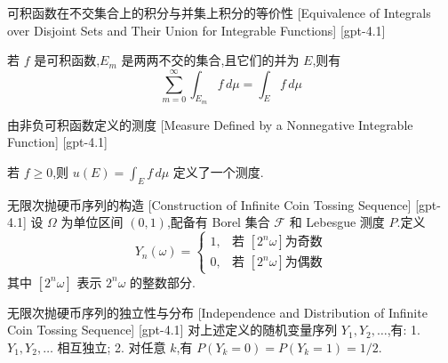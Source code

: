 \documentclass[UTF8]{ctexart}
\begin{document}
    
    
    \begin{thm}
        {可积函数在不交集合上的积分与并集上积分的等价性}
        [Equivalence of Integrals over Disjoint Sets and Their Union for Integrable Functions]
        [gpt-4.1]
        
若 $f$ 是可积函数,$E_{m}$ 是两两不交的集合,且它们的并为 $E$,则有
\[
\sum_{m = 0}^{\infty} \int_{E_{m}} f \, d\mu = \int_{E} f \, d\mu
\]

    \end{thm}
    
    
    
    \begin{dfn}
        {由非负可积函数定义的测度}
        [Measure Defined by a Nonnegative Integrable Function]
        [gpt-4.1]
        
若 $f \geq 0$,则 $
u(E) = \int_{E} f \, d\mu$ 定义了一个测度.

    \end{dfn}
    
    
    
    \begin{dfn}
        {无限次抛硬币序列的构造}
        [Construction of Infinite Coin Tossing Sequence]
        [gpt-4.1]
        设 $\Omega$ 为单位区间 $(0,1)$,配备有 Borel 集合 $\mathcal{F}$ 和 Lebesgue 测度 $P$.定义
\[
Y_n(\omega) = \begin{cases}
1, & \text{若 } [2^n \omega] \text{为奇数} \\
0, & \text{若 } [2^n \omega] \text{为偶数}
\end{cases}
\]
其中 $[2^n \omega]$ 表示 $2^n \omega$ 的整数部分.
    \end{dfn}
    
    
    
    \begin{thm}
        {无限次抛硬币序列的独立性与分布}
        [Independence and Distribution of Infinite Coin Tossing Sequence]
        [gpt-4.1]
        对上述定义的随机变量序列 $Y_1, Y_2, \ldots$,有:
1. $Y_1, Y_2, \ldots$ 相互独立;
2. 对任意 $k$,有 $P(Y_k=0) = P(Y_k=1) = 1/2$.
    \end{thm}
    
    
    
\end{document}
